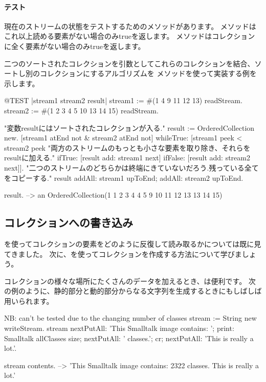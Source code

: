 \documentclass[a4paper,10pt,twoside]{book}
\begin{document}
\paragraph{テスト}現在のストリームの状態をテストするためのメソッドがあります。
メソッドはこれ以上読める要素がない場合のみtrueを返します。
メソッドはコレクションに全く要素がない場合のみtrueを返します。

二つのソートされたコレクションを引数としてこれらのコレクションを結合、ソートし別のコレクションにするアルゴリズムを
メソッドを使って実装する例を示します。

\begin{code}{@TEST |stream1 stream2 result|}
stream1 := #(1 4 9 11 12 13) readStream.
stream2 := #(1 2 3 4 5 10 13 14 15) readStream.

"変数resultにはソートされたコレクションが入る."
result := OrderedCollection new.
[stream1 atEnd not & stream2 atEnd not]
  whileTrue: [stream1 peek < stream2 peek
    "両方のストリームのもっとも小さな要素を取り除き、それらをresultに加える."
    ifTrue: [result add: stream1 next]
    ifFalse: [result add: stream2 next]].
"二つのストリームのどちらかは終端にきていないだろう.残っている全てをコピーする."
result
  addAll: stream1 upToEnd;
  addAll: stream2 upToEnd.

result. -->   an OrderedCollection(1 1 2 3 4 4 5 9 10 11 12 13 13 14 15)
\end{code}

\subsection{コレクションへの書き込み}

を使ってコレクションの要素をどのように反復して読み取るかについては既に見てきました。
次に、を使ってコレクションを作成する方法について学びましょう。


コレクションの様々な場所にたくさんのデータを加えるとき、は便利です。
次の例のように、静的部分と動的部分からなる文字列を生成するときにもしばしば用いられます。


\begin{code}{NB: can't be tested due to the changing number of classes}
stream := String new writeStream.
stream
  nextPutAll: 'This Smalltalk image contains: ';
  print: Smalltalk allClasses size;
  nextPutAll: ' classes.';
  cr;
  nextPutAll: 'This is really a lot.'.

stream contents. --> 'This Smalltalk image contains: 2322 classes.
This is really a lot.'
\end{code}
\end{document}
